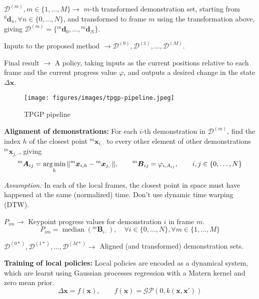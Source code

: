 \( \mathcal{D}^{(m)}, m \in \{ 1, \ldots, M \} \to \) \( m \)-th transformed demonstration set, starting from \( {}^{0}\boldsymbol{d}_n, \forall n \in \{ 0, \ldots, N \} \), and transformed to frame \( m \) using the transformation above, giving \( \mathcal{D}^{(m)} = \{ {}^{m}\boldsymbol{d}_0, \ldots, {}^{m}\boldsymbol{d}_N \} \).

Inputs to the proposed method \( \to \mathcal{D}^{(0)}, \mathcal{D}^{(1)}, \ldots, \mathcal{D}^{(M)} \).

Final result \( \to \) A policy, taking inputs as the current positions relative to each frame and the current progress value \( \varphi \), and outputs a desired change in the state \( \Delta \boldsymbol{x} \).

\begin{figure}[htbp]
    \centering
    \texttt{[image: figures/images/tpgp-pipeline.jpeg]}
    \caption{
        TPGP pipeline
    }\label{fig:tpgp-pipeline}
\end{figure}

\newpage
\textbf{Alignment of demonstrations:}
For each \( i \)-th demonstration in \( \mathcal{D}^{(m)} \), find the index \( h \) of the closest point \( {}^{m}\boldsymbol{x}_{i, \cdot} \) to every other element of other demonstrations \( {}^{m}\boldsymbol{x}_{j, \cdot} \), giving
\begin{equation}
    {}^{m}\boldsymbol{A}_{ij} = \operatorname*{arg\,min}_{h} \Vert {}^{m}\boldsymbol{x}_{i, h} - {}^{m}\boldsymbol{x}_{j, \cdot} \Vert
    , \qquad
    {}^{m}\boldsymbol{B}_{ij} = \varphi_{i, A_{ij}}
    , \qquad
    i, j \in \{ 0, \ldots, N \}
\end{equation}

\textit{Assumption:} In each of the local frames, the closest point in space must have happened at the same (normalized) time.
Don't use dynamic time warping (DTW).

\( P_{im} \to \) Keypoint progress values for demonstration \( i \) in frame \( m \).
\begin{equation}
    P_{im} = \operatorname{median}({}^{m}\boldsymbol{B}_{i\cdot}), \quad \forall i \in \{ 0, \ldots, N \}, \forall m \in \{ 1, \ldots, M \}
\end{equation}

\( \mathcal{D}^{(0*)}, \mathcal{D}^{(1*)}, \ldots, \mathcal{D}^{(M*)} \to \) Aligned (and transformed) demonstration sets.

\textbf{Training of local policies:}
Local policies are encoded as a dynamical system, which are learnt using Gaussian processes regression with a Matern kernel and zero mean prior.
\begin{equation}
    \Delta\boldsymbol{x} = f(\boldsymbol{x})
    , \qquad
    f(\boldsymbol{x}) = \mathcal{GP}(0, k(\boldsymbol{x}, \boldsymbol{x}'))
\end{equation}


